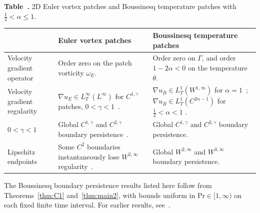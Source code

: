 \documentclass[reqno,11pt,a4paper]{amsart}
\begin{document}
\begin{center}
\label{tab:Euler-Bouss-subcritical}
\begin{minipage}{\textwidth}
\centering
\small
\textbf{Table~\thetable.}
2D Euler vortex patches and Boussinesq temperature patches
with $\frac12<\alpha\leq1$.
\par\medskip
\renewcommand{\arraystretch}{1.22}
\begin{tabular}{@{}
  >{\raggedright\arraybackslash}m{}|
  >{\raggedright\arraybackslash}m{}|
  >{\raggedright\arraybackslash}m{}@{}}
\hline
& \textbf{Euler vortex patches}
& \textbf{Boussinesq temperature patches}
\\ \hline
Velocity gradient operator
& Order zero on the patch vorticity $\omega_E$.
& Order zero on $\Gamma$, and order $1-2\alpha<0$
  on the temperature $\theta$.
\\ \hline
Velocity gradient regularity
& $\nabla u_E\in L^\infty_T(L^\infty)$
  for $C^{1,\gamma}$ patches,
  $0<\gamma<1$~\cite{Chem93,BerC}.
& $\nabla u_B\in L^1_T(W^{1,\infty})$
  for $\alpha=1$~\cite{GGJ17,CMX22};
  $\nabla u_B\in L^1_T(C^{2\alpha-1})$
  for $\frac12<\alpha<1$ \cite{KX22,LXY25}.
\\ \hline
$0<\gamma<1$
& Global $C^{1,\gamma}$ and $C^{2,\gamma}$
  boundary persistence~\cite{Chem93,BerC,Serf94,Radu22}.
& Global $C^{1,\gamma}$ and $C^{2,\gamma}$
  boundary persistence.
\\ \hline
Lipschitz endpoints
& Some $C^2$ boundaries instantaneously lose
  $W^{2,\infty}$ regularity~\cite{KL23}.
& Global $W^{2,\infty}$ and $W^{3,\infty}$
  boundary persistence.
\\ \hline
\end{tabular}

\par\smallskip
{\footnotesize\raggedright
The Boussinesq boundary persistence results listed here
follow from Theorems~\ref{thm:C1} and~\ref{thm:main2},
with bounds uniform in $\mathrm{Pr}\in[1,\infty)$
on each fixed finite time interval.
For earlier results, see~\cite{DZ17,GGJ17,CMX22,KX22,LXY25}.
\par}
\end{minipage}
\end{center}
\end{document}
